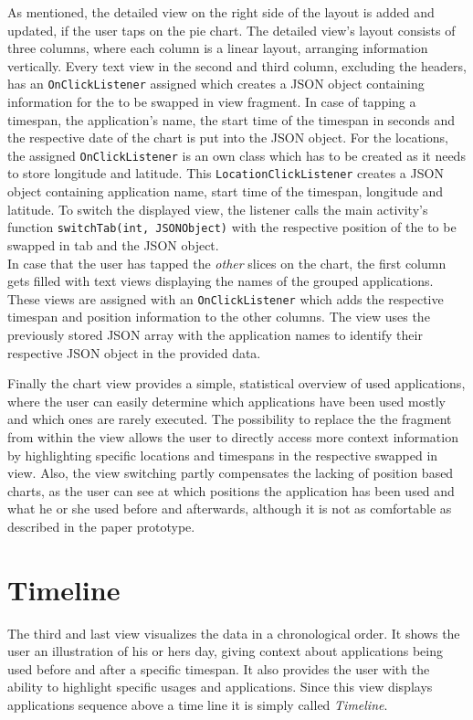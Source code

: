 As  mentioned, the detailed view on the right side of the layout is added and updated, if the user taps on the pie chart. The detailed view's layout consists of three columns, where each column is a linear layout, arranging information vertically. Every text view in the second and third column, excluding the headers, has an \lstinline$OnClickListener$ assigned which creates a JSON object containing information for the to be swapped in view fragment. In case of tapping a timespan, the application's name, the start time of the timespan in seconds and the respective date of the chart is put into the JSON object. For the locations, the assigned \lstinline$OnClickListener$ is an own class which has to be created as it needs to store longitude and latitude. This \lstinline$LocationClickListener$ creates a JSON object containing application name, start time of the timespan, longitude and latitude. To switch the displayed view, the listener calls the main activity's function \lstinline$switchTab(int, JSONObject)$ with the respective position of the to be swapped in tab and the JSON object.\\
In case that the user has tapped the \emph{other} slices on the chart, the first column gets filled with text views displaying the names of the grouped applications. These views are assigned with an \lstinline$OnClickListener$ which adds the respective timespan and position information to the other columns. The view uses the previously stored JSON array with the application names to identify their respective JSON object in the provided data.

Finally the chart view provides a simple, statistical overview of used applications, where the user can easily determine which applications have been used mostly and which ones are rarely executed. The possibility to replace the the fragment from within the view allows the user to directly access more context information by highlighting specific locations and timespans in the respective swapped in view. Also, the view switching partly compensates the lacking of position based charts, as the user can see at which positions the application has been used and what he or she used before and afterwards, although it is not as comfortable as described in the paper prototype.

\section{Timeline}
The third and last view visualizes the data in a chronological order. It shows the user an illustration of his or hers day, giving context about applications being used before and after a specific timespan. It also provides the user with the ability to highlight specific usages and applications. Since this view displays applications sequence above a time line it is simply called \emph{Timeline}.

